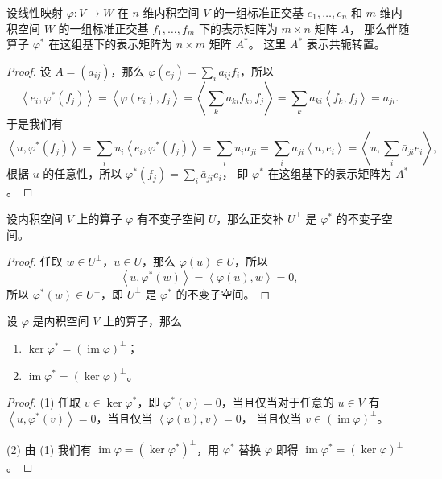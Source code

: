 \documentclass[fontset=none,zihao=-4]{Notes}
\DeclareMathOperator\im{im}
\newcommand{\inn}[1]{\left\langle#1\right\rangle}
\begin{document}
\begin{proposition}\label{prop:matrix of adjoint}
  设线性映射 $\varphi:V\to W$ 在 $n$ 维内积空间 $V$ 的一组标准正交基 $e_1,\dots,e_n$ 
  和 $m$ 维内积空间 $W$ 的一组标准正交基 $f_1,\dots,f_m$ 下的表示矩阵为 $m\times n$
  矩阵 $A$，
  那么伴随算子 $\varphi^*$ 在这组基下的表示矩阵为 $n\times m$ 矩阵 $A^*$。
  这里 $A^*$ 表示共轭转置。
\end{proposition}
\begin{proof}
  设 $A=(a_{ij})$，那么 $\varphi(e_j)=\sum_i a_{ij}f_i$，所以
  \[
    \inn{e_i,\varphi^*(f_j)}=\inn{\varphi(e_i),f_j}=\inn{\sum_k a_{ki}f_k,f_j}
    =\sum_k a_{ki}\inn{f_k,f_j}=a_{ji}.
  \]
  于是我们有
  \[
    \inn{u,\varphi^*(f_j)}=\sum_i u_i\inn{e_i,\varphi^*(f_j)}=\sum_i u_ia_{ji}
    =\sum_i a_{ji}\inn{u,e_i}=\inn{u,\sum_i \bar a_{ji}e_i},
  \]
  根据 $u$ 的任意性，所以 $\varphi^*(f_j)=\sum_i\bar a_{ji}e_i$，
  即 $\varphi^*$ 在这组基下的表示矩阵为 $A^*$。
\end{proof}

\begin{proposition}\label{prop:invariant space of adjoint}
  设内积空间 $V$ 上的算子 $\varphi$ 有不变子空间 $U$，那么正交补
  $U^\bot$ 是 $\varphi^*$ 的不变子空间。
\end{proposition}
\begin{proof}
  任取 $w\in U^\bot$，$u\in U$，那么 $\varphi(u)\in U$，所以
  \[
    \inn{u,\varphi^*(w)}=\inn{\varphi(u),w}=0,  
  \]
  所以 $\varphi^*(w)\in U^\bot$，即 $U^\bot$ 是 $\varphi^*$ 的不变子空间。
\end{proof}

\begin{proposition}\label{prop:ker and im of adjoint}
  设 $\varphi$ 是内积空间 $V$ 上的算子，那么
  \begin{enumerate}
    \item $\ker \varphi^*=(\im\varphi)^\bot$；
    \item $\im\varphi^*=(\ker\varphi)^\bot$。
  \end{enumerate}
\end{proposition}
\begin{proof}
  (1) 任取 $v\in\ker\varphi^*$，即 $\varphi^*(v)=0$，当且仅当对于任意的
  $u\in V$ 有 $\inn{u,\varphi^*(v)}=0$，当且仅当 $\inn{\varphi(u),v}=0$，
  当且仅当 $v\in(\im\varphi)^\bot$。

  (2) 由 (1) 我们有 $\im\varphi=(\ker\varphi^*)^\bot$，用 $\varphi^*$ 替换
  $\varphi$ 即得 $\im\varphi^*=(\ker\varphi)^\bot$。
\end{proof}
\end{document}
